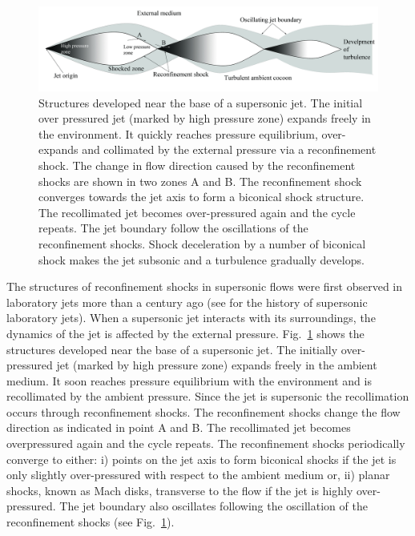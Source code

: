 
\begin{figure}[h!]
\centering
\includegraphics[width=\linewidth]{rsh.jpg}
\caption{Structures developed near the base of a supersonic jet. The initial over pressured jet (marked by high pressure zone) expands freely in the environment. It quickly reaches pressure equilibrium, over-expands and collimated by the external pressure via a reconfinement shock. The change in flow direction caused by the reconfinement shocks are shown in two zones A and B. The reconfinement shock converges towards the jet axis to form a biconical shock structure. The recollimated jet becomes over-pressured again and the cycle repeats. The jet boundary follow the oscillations of the reconfinement shocks. Shock deceleration by a number of biconical shock makes the jet subsonic and a turbulence gradually develops.}
\label{fig:rsh}
\end{figure}

The structures of reconfinement shocks in supersonic flows were first observed in laboratory jets more than a century ago (see \citet{krehl09} for the history of supersonic laboratory jets). When a supersonic jet interacts with its surroundings, the dynamics of the jet is affected by the external pressure. Fig.~\ref{fig:rsh} shows the structures developed near the base of a supersonic jet. The initially over-pressured jet (marked by high pressure zone) expands freely in the ambient medium. It soon reaches pressure equilibrium with the environment and is recollimated by the ambient pressure. Since the jet is supersonic the recollimation occurs through reconfinement shocks.
The reconfinement shocks change the flow direction as indicated in point A and B. The recollimated jet becomes overpressured again and the cycle repeats. The reconfinement shocks periodically converge to either: i) points on the jet axis to form biconical shocks if the jet is only slightly over-pressured with respect to the ambient medium or, ii) planar shocks, known as Mach disks, transverse to the flow if the jet is highly over-pressured. The jet boundary also oscillates following the oscillation of the reconfinement shocks (see Fig.~\ref{fig:rsh}).


